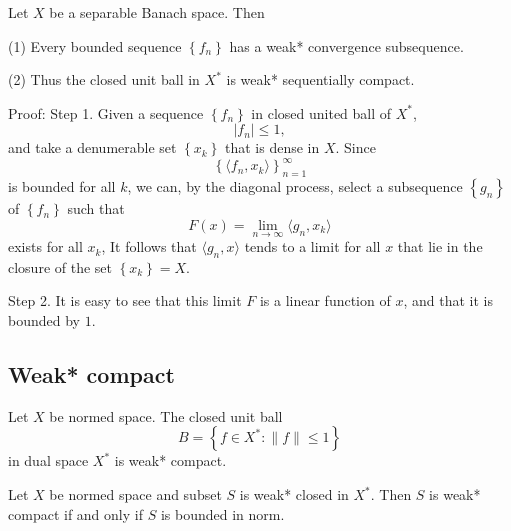 \documentclass[12pt, oneside]{book}
\begin{document}
\begin{theorem}[Helly]
    Let $X$ be a separable Banach space. Then

    (1) Every bounded sequence $\left\{f_n\right\}$ has a  weak* convergence subsequence.

    (2) Thus the closed unit ball in $X^*$ is weak* sequentially compact.

    Proof:
    Step 1.
    Given a sequence $\left\{f_n\right\}$ in closed united ball of $X^*$,
    \begin{equation*}
        \left|f_n\right| \leq 1,
    \end{equation*}
    and take a denumerable set $\left\{x_k\right\}$ that is dense in $X$.
    Since
    \begin{equation*}
        \left\{\langle f_n,x_k\rangle\right\}_{n=1}^\infty
    \end{equation*}
    is bounded for all $k$, we can, by the diagonal process, select a subsequence $\left\{g_n\right\}$ of $\left\{f_n\right\}$ such that
    \begin{equation*}
        F(x)
        =
        \lim _{n \rightarrow \infty}
        \langle g_n,x_k\rangle
    \end{equation*}
    exists for all $x_k$,
    It follows that $\langle g_n,x\rangle$ tends to a limit for all $x$ that lie in the closure of the set $\left\{x_k\right\}=X$.

    Step 2.
    It is easy to see that this limit $F$ is a linear function of $x$, and that it is bounded by $1$.
\end{theorem}
\subsection{Weak* compact}

\begin{theorem}
    Let $X$ be normed space. The closed unit ball
    \begin{equation*}
        B
        =
        \left\{f \in X^* :\|f\|\leq 1\right\}
    \end{equation*}
    in dual space $X^*$ is weak* compact.
\end{theorem}


\begin{corollary}
    Let $X$ be normed space and subset
    $S$ is weak* closed in $X^*$.
    Then $S$ is weak* compact if and only if $S$ is bounded in norm.
\end{corollary}
\end{document}

